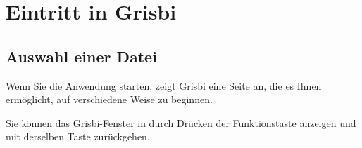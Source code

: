 
\chapter{Eintritt in Grisbi\label{entrance}}%

\section{Auswahl einer Datei\label{select-file}}%


Wenn Sie die Anwendung starten, zeigt Grisbi eine Seite an, die es Ihnen ermöglicht, auf verschiedene Weise zu beginnen.%


Sie können das Grisbi-Fenster in  durch Drücken der Funktionstaste  anzeigen und mit derselben Taste zurückgehen.%


